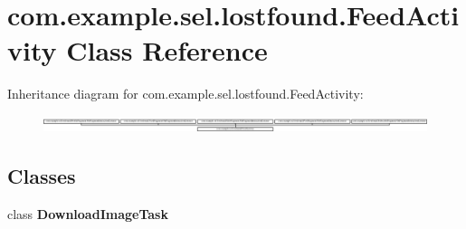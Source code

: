 \hypertarget{classcom_1_1example_1_1sel_1_1lostfound_1_1FeedActivity}{\section{com.\-example.\-sel.\-lostfound.\-Feed\-Activity \-Class \-Reference}
\label{classcom_1_1example_1_1sel_1_1lostfound_1_1FeedActivity}
}
\-Inheritance diagram for com.\-example.\-sel.\-lostfound.\-Feed\-Activity\-:\begin{figure}[H]
\begin{center}
\leavevmode
\includegraphics[height=0.486957cm]{classcom_1_1example_1_1sel_1_1lostfound_1_1FeedActivity}
\end{center}
\end{figure}
\subsection*{\-Classes}
\begin{DoxyCompactItemize}
\item 
class {\bfseries \-Download\-Image\-Task}
\end{DoxyCompactItemize}

